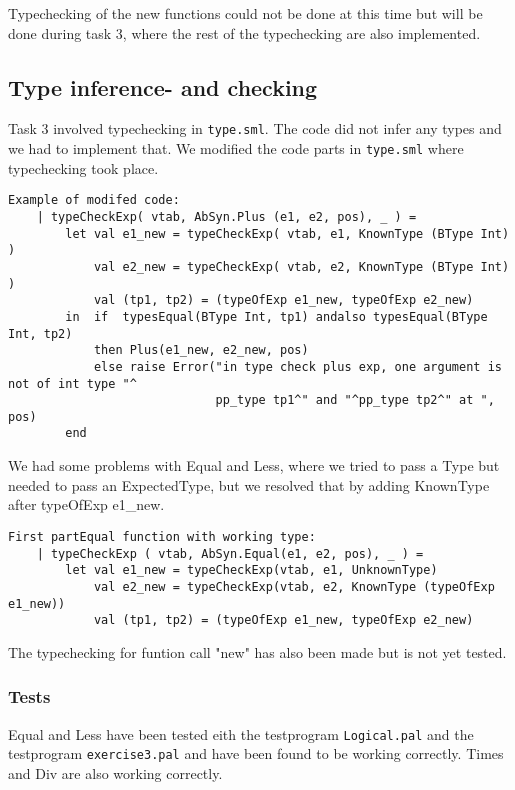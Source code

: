 \documentclass[11pt]{article}
\begin{document}
Typechecking of the new functions could not be done at this time but will be done during task 3, where the rest of the typechecking are also implemented.
 
\subsection{Type inference- and checking}
Task 3 involved typechecking in {\tt type.sml}. The code did not infer any types and we had to implement that. We modified the code parts in {\tt type.sml} where typechecking took place.

\begin{lstlisting}
Example of modifed code:
    | typeCheckExp( vtab, AbSyn.Plus (e1, e2, pos), _ ) =
        let val e1_new = typeCheckExp( vtab, e1, KnownType (BType Int) )
            val e2_new = typeCheckExp( vtab, e2, KnownType (BType Int) )
            val (tp1, tp2) = (typeOfExp e1_new, typeOfExp e2_new)
        in  if  typesEqual(BType Int, tp1) andalso typesEqual(BType Int, tp2)
            then Plus(e1_new, e2_new, pos)
            else raise Error("in type check plus exp, one argument is not of int type "^
                             pp_type tp1^" and "^pp_type tp2^" at ", pos)
        end
\end{lstlisting}
        
We had some problems with Equal and Less, where we tried to pass a Type but needed to pass an ExpectedType, but we resolved that by adding KnownType after typeOfExp e1\_new.

\begin{lstlisting}
First partEqual function with working type:
    | typeCheckExp ( vtab, AbSyn.Equal(e1, e2, pos), _ ) =
        let val e1_new = typeCheckExp(vtab, e1, UnknownType)
            val e2_new = typeCheckExp(vtab, e2, KnownType (typeOfExp e1_new))
            val (tp1, tp2) = (typeOfExp e1_new, typeOfExp e2_new)
\end{lstlisting}

The typechecking for funtion call "new" has also been made but is not yet tested.

\subsubsection{Tests}
Equal and Less have been tested eith the testprogram {\tt Logical.pal} and the testprogram {\tt exercise3.pal} and have been found to be working correctly. Times and Div are also working correctly.
\end{document}
